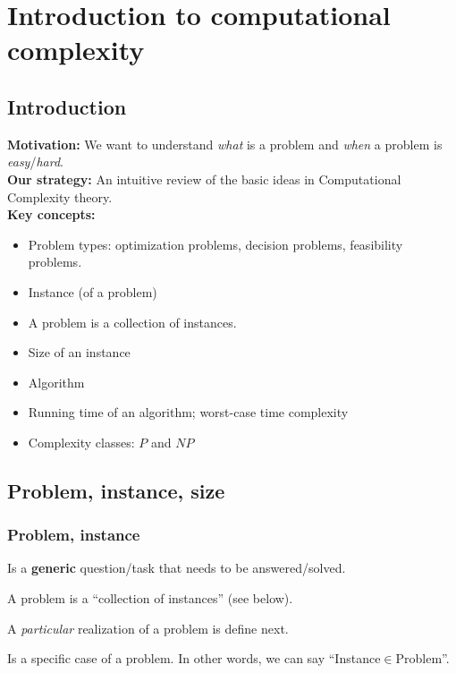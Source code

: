 \documentclass[../open-optimization/open-optimization.tex]{subfiles}
\begin{document}
\newcommand{\mathup}[1]{#1}
\newcommand{\NP}{\text{NP}}
\newcommand{\coNP}{\text{coNP}}

\chapter{ Introduction to computational complexity}


\section{Introduction}

{\bf Motivation:} We want to understand {\em what} is a problem and {\em when} a problem is {\em easy}/{\em hard}.\\

{\bf Our strategy:} An intuitive review of the basic ideas in Computational Complexity theory.\\ 

{\bf Key concepts:}
	\begin{itemize}
		\item Problem types: optimization problems, decision problems, feasibility problems.
		\item Instance (of a problem)
		\item A problem is a collection of instances.
		\item Size of an instance
		\item Algorithm
		\item Running time of an algorithm; worst-case time complexity
		\item Complexity classes: ${\mathup{P}}$ and ${\mathup{NP}}$
\end{itemize}

\section{Problem, instance, size}
\subsection{Problem, instance}
\begin{definition}[Problem]
Is a {\bf generic} question/task that needs to be answered/solved. 

A problem is a ``collection of instances'' (see below).
\end{definition}


A {\em particular} realization of a problem is define next.

\begin{definition}[Instance]
Is a specific case of a problem. In other words, we can say ``Instance$\in$Problem''.
\end{definition}
\end{document}
